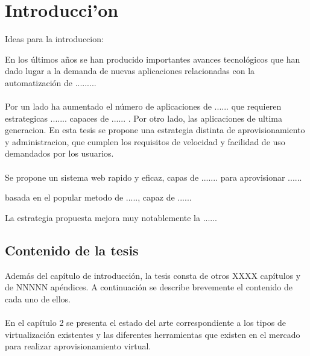 \chapter{Introducci'on}

Ideas para la introduccion:

En los últimos años se han producido importantes avances tecnológicos que han dado lugar a la demanda de nuevas aplicaciones relacionadas con la automatización de .........\\
\\
Por un lado ha aumentado el número de aplicaciones de ...... que requieren estrategicas ....... capaces de ...... . Por otro lado, las aplicaciones  de ultima generacion. En esta tesis se propone una estrategia distinta de aprovisionamiento y administracion, que cumplen los requisitos de velocidad y facilidad de uso demandados por los usuarios.\\
\\
Se propone un sistema web rapido y eficaz, capas de ....... para aprovisionar ...... 

basada en el popular metodo de ....., capaz de ......

La estrategia propuesta mejora muy notablemente la ......

\section{Contenido de la tesis}
Además del capítulo de introducción, la tesis consta de otros XXXX capítulos y de NNNNN apéndices. A continuación se describe brevemente el contenido de cada uno de ellos.\\
\\
En el capítulo 2 se presenta el estado del arte correspondiente a los tipos de virtualización existentes y las diferentes herramientas que existen en el mercado para realizar aprovisionamiento virtual.



